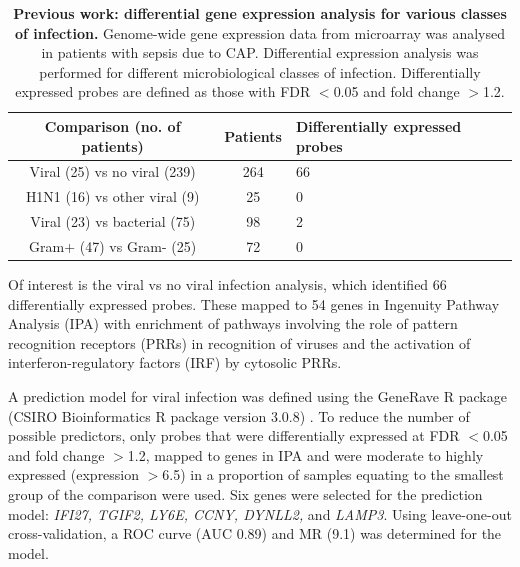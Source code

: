 \FloatBarrier
\begin{table}[]
\begin{center}
\begin{tabular}{|c|c|l|}
\hline
\textbf{Comparison (no. of patients)} & \textbf{Patients} & \textbf{Differentially expressed probes} \\ \hline
Viral (25) vs no viral (239)          & 264               & 66                                       \\ \hline
H1N1 (16) vs other viral (9)          & 25                & 0                                        \\ \hline
Viral (23) vs bacterial (75)          & 98                & 2                                        \\ \hline
Gram+ (47) vs Gram- (25)              & 72                & 0                                        \\ \hline
\end{tabular}

\end{center}
\smallskip
\caption[Previous work transcriptomic signatures for microbiology] {\textbf{Previous work: differential gene expression analysis for various classes of infection.} Genome-wide gene expression data from microarray was analysed in patients with sepsis due to CAP. Differential expression analysis was performed for different microbiological classes of infection. Differentially expressed probes are defined as those with FDR $<$0.05 and fold change $>$1.2.} 
\label{tab:emmaDEgenes}
\end{table}


Of interest is the viral vs no viral infection  analysis, which identified 66 differentially expressed probes. These mapped to 54 genes in Ingenuity Pathway Analysis (IPA) with enrichment of pathways involving the role of pattern recognition receptors (PRRs) in recognition of viruses and the activation of interferon-regulatory factors (IRF) by cytosolic PRRs.

A prediction model for viral infection was defined using the GeneRave R package (CSIRO Bioinformatics R package version 3.0.8) \parencite{Kiiveri2008}. To reduce the number of possible predictors, only probes that were differentially expressed at FDR $<$0.05 and fold change $>$1.2, mapped to genes in IPA and were moderate to highly expressed (expression $>$6.5) in a proportion of samples equating to the smallest group of the comparison were used. Six genes were selected for the prediction model: \textit{IFI27, TGIF2, LY6E, CCNY, DYNLL2,} and \textit{LAMP3}. Using leave-one-out cross-validation, a ROC curve (AUC 0.89) and MR (9.1) was determined for the model.

